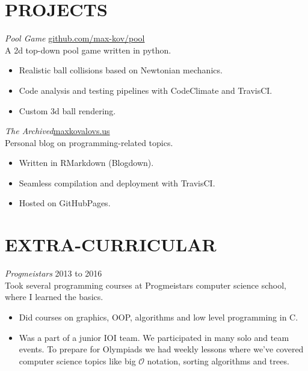 \documentclass[margin, 10pt]{res} %
\begin{document}
\begin{resume}
\section{PROJECTS}

{\sl Pool Game} \hfill \href{https://github.com/max-kov/pool}{github.com/max-kov/pool}\\
A 2d top-down pool game written in python.

\begin{itemize} \itemsep -2pt
\item Realistic ball collisions based on Newtonian mechanics.
\item Code analysis and testing pipelines with CodeClimate and TravisCI.
\item Custom 3d ball rendering.
\end{itemize}

{\sl The Archived}\hfill \href{https://maxkovalovs.us}{maxkovalovs.us}\\
Personal blog on programming-related topics.

\begin{itemize} \itemsep -2pt
\item Written in RMarkdown (Blogdown).
\item Seamless compilation and deployment with TravisCI.
\item Hosted on GitHubPages.
\end{itemize}

\section{EXTRA-CURRICULAR} 

{\sl Progmeistars} \hfill 2013 to 2016\\
Took several programming courses at Progmeistars computer science school, where I learned the basics.

\begin{itemize}
\item Did courses on graphics, OOP, algorithms and low level programming in C.
\item Was a part of a junior IOI team. We participated in many solo and team events. To prepare for Olympiads we had weekly lessons where we've covered computer science topics like big $\mathcal{O}$ notation, sorting algorithms and trees.
\end{itemize}

\end{resume}
\end{document}
